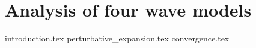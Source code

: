 \chapter{Analysis of four wave models}

{introduction.tex}
{perturbative_expansion.tex}
{convergence.tex}